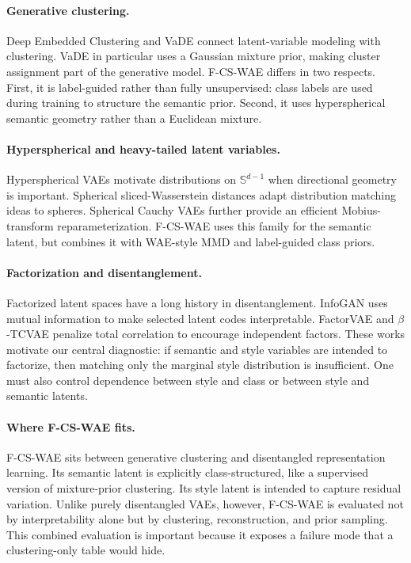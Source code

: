 \documentclass[10pt]{article}
\newcommand{\ours}{F-CS-WAE}
\newcommand{\Sph}{\mathbb{S}}
\begin{document}
\paragraph{Generative clustering.}
Deep Embedded Clustering \citep{xie2015unsupervised} and VaDE \citep{jiang2016variational} connect latent-variable modeling with clustering. VaDE in particular uses a Gaussian mixture prior, making cluster assignment part of the generative model. \ours{} differs in two respects. First, it is label-guided rather than fully unsupervised: class labels are used during training to structure the semantic prior. Second, it uses hyperspherical semantic geometry rather than a Euclidean mixture.

\paragraph{Hyperspherical and heavy-tailed latent variables.}
Hyperspherical VAEs \citep{davidson2018hyperspherical} motivate distributions on $\Sph^{d-1}$ when directional geometry is important. Spherical sliced-Wasserstein distances \citep{bonet2022spherical} adapt distribution matching ideas to spheres. Spherical Cauchy VAEs \citep{sablica2025hyperspherical} further provide an efficient Mobius-transform reparameterization. \ours{} uses this family for the semantic latent, but combines it with WAE-style MMD and label-guided class priors.

\paragraph{Factorization and disentanglement.}
Factorized latent spaces have a long history in disentanglement. InfoGAN \citep{chen2016infogan} uses mutual information to make selected latent codes interpretable. FactorVAE \citep{kim2018disentangling} and $\beta$-TCVAE \citep{chen2018isolating} penalize total correlation to encourage independent factors. These works motivate our central diagnostic: if semantic and style variables are intended to factorize, then matching only the marginal style distribution is insufficient. One must also control dependence between style and class or between style and semantic latents.

\paragraph{Where \ours{} fits.}
\ours{} sits between generative clustering and disentangled representation learning. Its semantic latent is explicitly class-structured, like a supervised version of mixture-prior clustering. Its style latent is intended to capture residual variation. Unlike purely disentangled VAEs, however, \ours{} is evaluated not by interpretability alone but by clustering, reconstruction, and prior sampling. This combined evaluation is important because it exposes a failure mode that a clustering-only table would hide.
\end{document}
